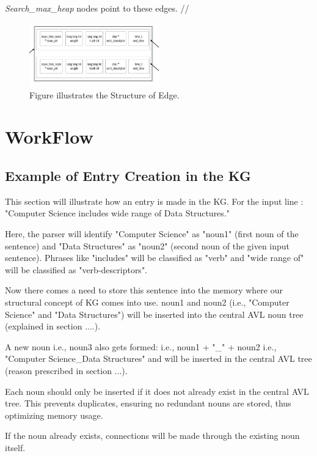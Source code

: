 \documentclass[conference]{IEEEtran}
\begin{document}
\textit{Search\_max\_heap} nodes point to these edges.
//




\begin{figure}[htbp]
\centerline{\includegraphics[width=0.5\textwidth]{fig_4_2.png}}
\caption{Figure illustrates the Structure of Edge.}
\label{fig}
\end{figure}



\section{WorkFlow}
\subsection{Example of Entry Creation in the KG}

This section will illustrate how an entry is made in the KG.
For the input line : "Computer Science includes wide range of
Data Structures."

Here, the parser will identify "Computer Science" as "noun1" (first noun of the sentence)
and "Data Structures" as "noun2" (second noun of the given input sentence).
Phrases like "includes" will be classified as "verb" and "wide range of" will be classified as "verb-descriptors".

Now there comes a need to store this sentence into the memory where our structural concept
of KG comes into use.
noun1 and noun2 (i.e., "Computer Science" and "Data Structures") will be inserted into the central AVL noun
tree (explained in section ....).

A new noun i.e., noun3 also gets formed: i.e., noun1 + "\_" + noun2 i.e., "Computer Science\_Data Structures"
and will be inserted in the central AVL tree (reason prescribed in section ...).

Each noun should only be inserted if it does not already exist in the central AVL tree. 
This prevents duplicates, ensuring no redundant nouns are stored, thus optimizing memory usage.

If the noun already exists, connections will be made through the existing noun itself.
\end{document}
